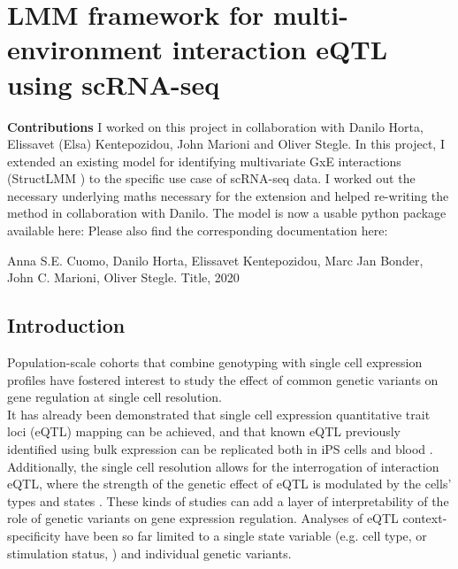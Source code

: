 
\chapter{LMM framework for multi-environment interaction eQTL using scRNA-seq}

\begin{Abstract}
\hspace{-3mm}\textbf{Contributions} I worked on this project in collaboration with Danilo Horta, Elissavet (Elsa) Kentepozidou, John Marioni and Oliver Stegle.
In this project, I extended an existing model for identifying multivariate GxE interactions (StructLMM \cite{moore2019linear}) to the specific use case of scRNA-seq data.
I worked out the necessary underlying maths necessary for the extension and helped re-writing the method in collaboration with Danilo. 
The model is now a usable python package available here:
Please also find the corresponding documentation here:

Anna S.E. Cuomo, Danilo Horta, Elissavet Kentepozidou, Marc Jan Bonder, John C. Marioni, Oliver Stegle. 
Title, 2020

\vfill
\end{Abstract}

\section{Introduction} 

Population-scale cohorts that combine genotyping with single cell expression profiles have fostered interest to study the effect of common genetic variants on gene regulation at single cell resolution.\\

It has already been demonstrated that single cell expression quantitative trait loci (eQTL) mapping can be achieved, and that known eQTL previously identified using bulk expression can be replicated both in iPS cells and blood \cite{cuomo2020single,van2018single}.
Additionally, the single cell resolution allows for the interrogation of interaction eQTL, where the strength of the genetic effect of eQTL is modulated by the cells’ types and states \cite{cuomo2020single}. 
These kinds of studies can add a layer of interpretability of the role of genetic variants on gene expression regulation. 
Analyses of eQTL context-specificity have been so far limited to a single state variable (e.g. cell type, \cite{fairfax2012genetics} or stimulation status,\cite{fairfax2014innate} ) and individual genetic variants.\\

